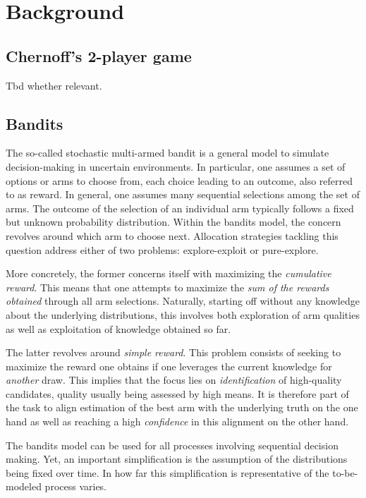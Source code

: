 \chapter{Background}

\section{Chernoff's 2-player game}
Tbd whether relevant.

\section{Bandits}
The so-called stochastic multi-armed bandit is a general model to simulate
decision-making in uncertain environments. In particular, one assumes a set of
options or arms to choose from, each choice leading to an outcome, also referred
to as reward. In general, one assumes many sequential selections among the set
of arms. The outcome of the selection of an individual arm typically follows a
fixed but unknown probability distribution.
Within the bandits model, the concern revolves around which arm to choose next.
Allocation strategies tackling this question address either of two problems:
explore-exploit or pure-explore.

More concretely, the former concerns itself with maximizing the \emph{cumulative
reward}. This means that one attempts to maximize the \emph{sum of the rewards
obtained} through all arm selections. Naturally, starting off without any
knowledge about the underlying distributions, this involves both exploration of
arm qualities as well as exploitation of knowledge obtained so far.

The latter revolves around \emph{simple reward}. This problem consists of
seeking to maximize the reward one obtains if one leverages the current
knowledge for \emph{another} draw. This implies that the focus lies on
\emph{identification} of high-quality candidates, quality usually being assessed
by high means. It is therefore part of the task to align estimation of the
best arm with the underlying truth on the one hand as well as reaching a high
\emph{confidence} in this alignment on the other hand.

The bandits model can be used for all processes involving sequential decision
making. Yet, an important simplification is the assumption of the distributions
being fixed over time. In how far this simplification is representative of the
to-be-modeled process varies.


